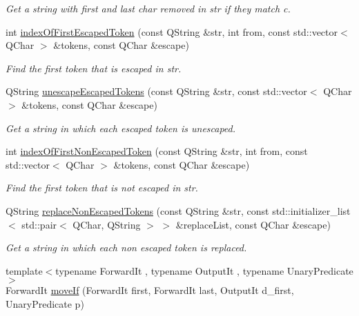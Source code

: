 \begin{DoxyCompactItemize}
\begin{DoxyCompactList}\small\item\em Get a string with first and last char removed in str if they match c. \end{DoxyCompactList}\item 
int \hyperlink{namespace_mdt_1_1_algorithm_aadf56549e804ffc292f5b61d4872512b}{index\+Of\+First\+Escaped\+Token} (const Q\+String \&str, int from, const std\+::vector$<$ Q\+Char $>$ \&tokens, const Q\+Char \&escape)
\begin{DoxyCompactList}\small\item\em Find the first token that is escaped in str. \end{DoxyCompactList}\item 
Q\+String \hyperlink{namespace_mdt_1_1_algorithm_a130525973374548a61151ef433a8534c}{unescape\+Escaped\+Tokens} (const Q\+String \&str, const std\+::vector$<$ Q\+Char $>$ \&tokens, const Q\+Char \&escape)
\begin{DoxyCompactList}\small\item\em Get a string in which each escaped token is unescaped. \end{DoxyCompactList}\item 
int \hyperlink{namespace_mdt_1_1_algorithm_a25b3247b25cdf25db6a2641269e37e0d}{index\+Of\+First\+Non\+Escaped\+Token} (const Q\+String \&str, int from, const std\+::vector$<$ Q\+Char $>$ \&tokens, const Q\+Char \&escape)
\begin{DoxyCompactList}\small\item\em Find the first token that is not escaped in str. \end{DoxyCompactList}\item 
Q\+String \hyperlink{namespace_mdt_1_1_algorithm_a1b8c9cb581bf7a508e3bab5e91c60370}{replace\+Non\+Escaped\+Tokens} (const Q\+String \&str, const std\+::initializer\+\_\+list$<$ std\+::pair$<$ Q\+Char, Q\+String $>$ $>$ \&replace\+List, const Q\+Char \&escape)
\begin{DoxyCompactList}\small\item\em Get a string in which each non escaped token is replaced. \end{DoxyCompactList}\item 
{\footnotesize template$<$typename Forward\+It , typename Output\+It , typename Unary\+Predicate $>$ }\\Forward\+It \hyperlink{namespace_mdt_1_1_algorithm_a1f739be25cc7de2c30a21b85d9b25f0a}{move\+If} (Forward\+It first, Forward\+It last, Output\+It d\+\_\+first, Unary\+Predicate p)

\end{DoxyCompactItemize}
